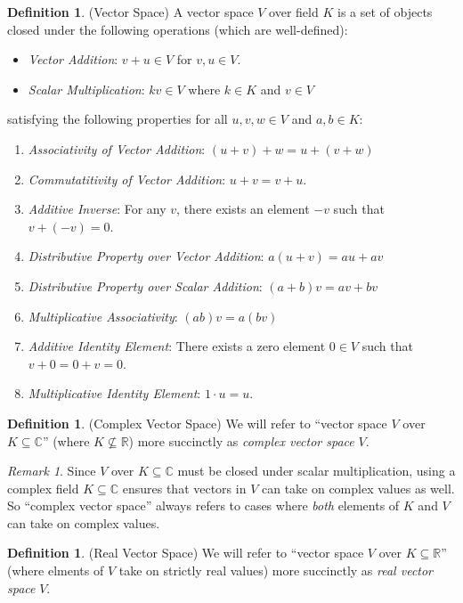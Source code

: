 \documentclass[12pt]{article}
\numberwithin{equation}{section} %
\theoremstyle{plain}
\theoremstyle{definition}
\newtheorem{defn}[thm]{Definition}
\theoremstyle{remark}
\newtheorem*{rmk}{Remark}
\newcommand{\R}{\mathbb{R}}
\newcommand{\C}{\mathbb{C}}
\begin{document}
\begin{defn}(Vector Space)
A vector space $V$ over field $K$ is a set of objects closed under the
following operations (which are well-defined):
\begin{itemize}
  \item \emph{Vector Addition}: $v+u\in V$ for $v,u\in V$.
  \item \emph{Scalar Multiplication}: $kv\in V$ where $k\in K$ and $v\in
    V$
\end{itemize}
satisfying the following properties for all $u,v,w\in V$ and $a,b\in K$:
\begin{enumerate}[label=(\roman*)]
  \item \emph{Associativity of Vector Addition}: $(u+v)+w = u + (v+w)$
  \item \emph{Commutatitivity of Vector Addition}: $u+v=v+u$.
  \item \emph{Additive Inverse}: For any $v$, there exists an element
    $-v$ such that $v+(-v)=0$.
  \item \emph{Distributive Property over Vector Addition}:
    $a(u+v) = au + av$
  \item \emph{Distributive Property over Scalar Addition}:
    $(a+b)v = av + bv$
  \item \emph{Multiplicative Associativity}: $(ab)v = a(bv)$
  \item \emph{Additive Identity Element}: There exists a zero element
    $0\in V$ such that $v+0 = 0+v=0$.
  \item \emph{Multiplicative Identity Element}: $1\cdot u = u$.
\end{enumerate}
\end{defn}

\begin{defn}(Complex Vector Space)
We will refer to ``vector space $V$ over $K\subseteq\C$'' (where
$K\not\subseteq\R$) more succinctly as \emph{complex vector space} $V$.
\end{defn}

\begin{rmk}
Since $V$ over $K\subseteq\C$ must be closed under scalar
multiplication, using a complex field $K\subseteq\C$ ensures that
vectors in $V$ can take on complex values as well. So ``complex vector
space'' always refers to cases where \emph{both} elements of $K$ and $V$
can take on complex values.
\end{rmk}

\begin{defn}(Real Vector Space)
We will refer to ``vector space $V$ over $K\subseteq\R$'' (where elments
of $V$ take on strictly real values) more succinctly as
\emph{real vector space} $V$.
\end{defn}
\end{document}
